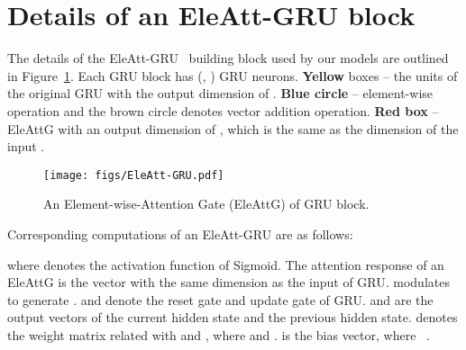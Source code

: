 \documentclass[10pt,twocolumn,letterpaper]{article}
\begin{document}
\section{Details of an EleAtt-GRU block}\label{EleAtt-GRU}
The details of the EleAtt-GRU~\cite{zhang2019eleatt} building block used by our models are outlined in Figure~\ref{fig:EleAtt-GRU}. Each GRU block has (, ) GRU neurons. {\bf Yellow} boxes -- the units of the original GRU with the output dimension of . {\bf Blue circle} -- element-wise operation and the brown circle denotes vector addition operation. {\bf Red box} -- EleAttG with an output dimension of , which is the same as the dimension of the input .
\begin{figure}[h]
\texttt{[image: figs/EleAtt-GRU.pdf]}
\caption{An Element-wise-Attention Gate (EleAttG) of GRU block.}
\vspace{-15pt}
\label{fig:EleAtt-GRU}
\end{figure}


Corresponding computations of an EleAtt-GRU are as follows:

where  denotes the activation function of Sigmoid. The attention response of an EleAttG is the vector  with the same dimension as the input  of GRU.  modulates  to generate .  and  denote the reset gate and update gate of GRU.  and  are the output vectors of the current hidden state and the previous hidden state.  denotes the weight matrix related with  and , where  and .  is the bias vector, where ~\cite{zhang2019eleatt}.
\end{document}

